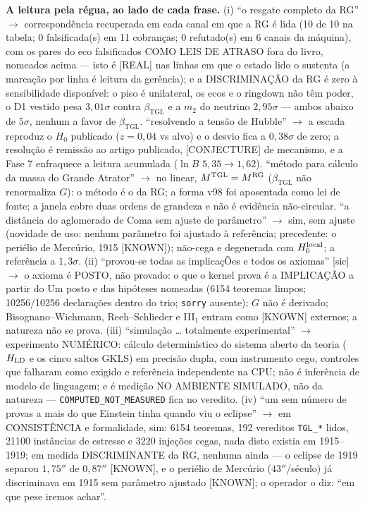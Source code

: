 \documentclass[11pt]{article}
\newcommand{\bTGL}{\beta_{\mathrm{TGL}}}\newcommand{\Msun}{M_{\odot}}\newcommand{\TGL}{\mathrm{TGL}}
\theoremstyle{definition}\newtheorem{deriv}{Derivação}
\begin{document}
\textbf{A leitura pela régua, ao lado de cada frase.} (i) ``o resgate completo da RG'' $\to$ correspondência recuperada em cada canal em que a RG é lida (10 de 10 na tabela; 0 falsificada(s) em 11 cobranças; 0 refutado(s) em 6 canais da máquina), com os pares do eco falsificados COMO LEIS DE ATRASO fora do livro, nomeados acima --- isto é \textsf{[REAL]} nas linhas em que o estado lido o sustenta (a marcação por linha é leitura da gerência); e a DISCRIMINAÇÃO da RG é zero à sensibilidade disponível: o piso é unilateral, os ecos e o ringdown não têm poder, o D1 vestido pesa $3{,}01\sigma$ contra $\bTGL$ e a $m_2$ do neutrino $2{,}95\sigma$ --- ambos abaixo de $5\sigma$, nenhum a favor de $\bTGL$. ``resolvendo a tensão de Hubble'' $\to$ a escada reproduz o $H_0$ publicado ($z=0{,}04$ vs alvo) e o desvio fica a $0{,}38\sigma$ de zero; a resolução é remissão ao artigo publicado, \textsf{[CONJECTURE]} de mecanismo, e a Fase 7 enfraquece a leitura acumulada ($\ln B$ $5{,}35\to1{,}62$). ``método para cálculo da massa do Grande Atrator'' $\to$ no linear, $M^{\rm TGL}=M^{\rm RG}$ ($\bTGL$ não renormaliza $G$): o método é o da RG; a forma v98 foi aposentada como lei de fonte; a janela cobre duas ordens de grandeza e não é evidência não-circular. ``a distância do aglomerado de Coma sem ajuste de parâmetro'' $\to$ sim, sem ajuste (novidade de uso: nenhum parâmetro foi ajustado à referência; precedente: o periélio de Mercúrio, 1915 \textsf{[KNOWN]}); não-cega e degenerada com $H_0^{\rm local}$; a referência a $1{,}3\sigma$. (ii) ``provou-se todas as implicaçÕes e todos os axiomas'' [sic] $\to$ o axioma é POSTO, não provado: o que o kernel prova é a IMPLICAÇÃO a partir do Um posto e das hipóteses nomeadas (6154 teoremas limpos; 10256/10256 declarações dentro do trio; \texttt{sorry} ausente); $G$ não é derivado; Bisognano--Wichmann, Reeh--Schlieder e III$_1$ entram como \textsf{[KNOWN]} externos; a natureza não se prova. (iii) ``simulação … totalmente experimental'' $\to$ experimento NUMÉRICO: cálculo determinístico do sistema aberto da teoria ($H_{\rm LD}$ e os cinco saltos GKLS) em precisão dupla, com instrumento cego, controles que falharam como exigido e referência independente na CPU; não é inferência de modelo de linguagem; e é medição NO AMBIENTE SIMULADO, não da natureza --- \texttt{COMPUTED\_NOT\_MEASURED} fica no veredito. (iv) ``um sem número de provas a mais do que Einstein tinha quando viu o eclipse'' $\to$ em CONSISTÊNCIA e formalidade, sim: 6154 teoremas, 192 vereditos \texttt{TGL\_*} lidos, 21100 instâncias de estresse e 3220 injeções cegas, nada disto existia em 1915--1919; em medida DISCRIMINANTE da RG, nenhuma ainda --- o eclipse de 1919 separou $1{,}75''$ de $0{,}87''$ \textsf{[KNOWN]}, e o periélio de Mercúrio ($43''$/século) já discriminava em 1915 sem parâmetro ajustado \textsf{[KNOWN]}; o operador o diz: ``em que pese iremos achar''.
\end{document}
